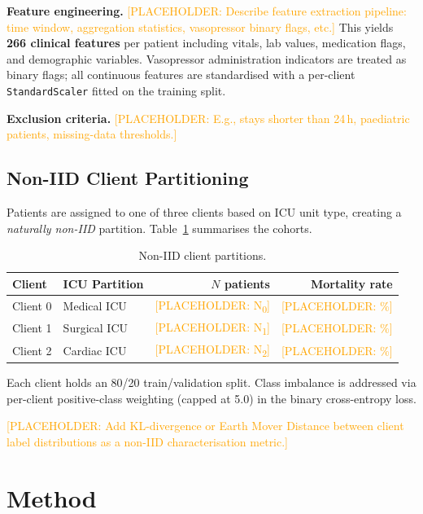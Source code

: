 \documentclass[10pt,twocolumn]{article}
\newcommand{\placeholder}[1]{\textcolor{orange}{[PLACEHOLDER: #1]}}
\begin{document}
\textbf{Feature engineering.}
\placeholder{Describe feature extraction pipeline: time window,
aggregation statistics, vasopressor binary flags, etc.}
This yields \textbf{266 clinical features} per patient including
vitals, lab values, medication flags, and demographic variables.
Vasopressor administration indicators are treated as binary flags;
all continuous features are standardised with a per-client
\texttt{StandardScaler} fitted on the training split.

\textbf{Exclusion criteria.}
\placeholder{E.g., stays shorter than 24\,h, paediatric patients,
missing-data thresholds.}

\subsection{Non-IID Client Partitioning}

Patients are assigned to one of three clients based on ICU unit type,
creating a \emph{naturally non-IID} partition.  Table~\ref{tab:clients}
summarises the cohorts.

\begin{table}[h]
\centering
\caption{Non-IID client partitions.}
\label{tab:clients}
\begin{tabular}{llrr}
\toprule
Client & ICU Partition & $N$ patients & Mortality rate \\
\midrule
Client 0 & Medical ICU   & \placeholder{N\textsubscript{0}} & \placeholder{\%} \\
Client 1 & Surgical ICU  & \placeholder{N\textsubscript{1}} & \placeholder{\%} \\
Client 2 & Cardiac ICU   & \placeholder{N\textsubscript{2}} & \placeholder{\%} \\
\bottomrule
\end{tabular}
\end{table}

Each client holds an 80/20 train/validation split.  Class imbalance is
addressed via per-client positive-class weighting (capped at 5.0) in
the binary cross-entropy loss.

\placeholder{Add KL-divergence or Earth Mover Distance between client
label distributions as a non-IID characterisation metric.}

\section{Method}
\label{sec:method}
\end{document}
